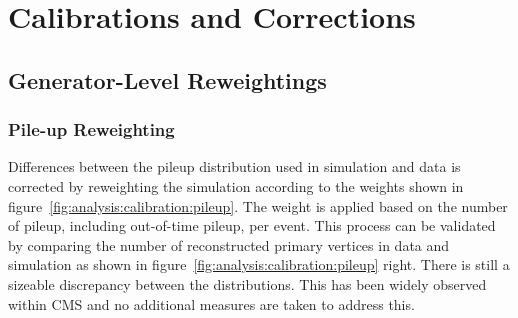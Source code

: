 
\section{Calibrations and Corrections}
\label{sec:analysis:calibration}



\subsection{Generator-Level Reweightings}
\label{sec:analysis:calibration:genlevel}


\subsubsection{Pile-up Reweighting}
Differences between the pileup distribution used in simulation and data is corrected by reweighting the simulation according to the weights shown in figure~\ref{fig:analysis:calibration:pileup}. The weight is applied based on the number of pileup, including out-of-time pileup, per event.  This process can be validated by comparing the number of reconstructed primary vertices in data and simulation as shown in figure~\ref{fig:analysis:calibration:pileup} right. There is still a sizeable discrepancy between the distributions. This has been widely observed within CMS and no additional measures are taken to address this.
